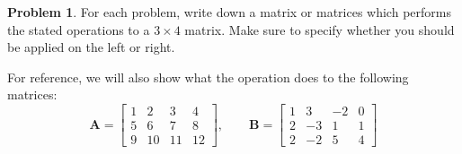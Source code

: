 \documentclass[12pt]{article}
\theoremstyle{definition}
\newtheorem{problem}{Problem}
\renewcommand{\vec}{\mathbf}
\begin{document}
\clearpage

\begin{problem}
    For each problem, write down a matrix or matrices which performs the stated operations to a $3\times 4$ matrix.
    Make sure to specify whether you should be applied on the left or right.

    For reference, we will also show what the operation does to the following matrices:
    \[
        \vec{A} = 
        \begin{bmatrix}
            1 & 2 & 3 & 4 \\
            5 & 6 & 7 & 8 \\
            9 & 10 & 11 & 12
        \end{bmatrix}
        ,\qquad 
        \vec{B} = 
        \begin{bmatrix}
            1 & 3& -2 & 0 \\
            2 & -3 & 1 & 1 \\
            2 & -2 & 5 & 4
        \end{bmatrix}
    \]


\end{problem}
\end{document}
